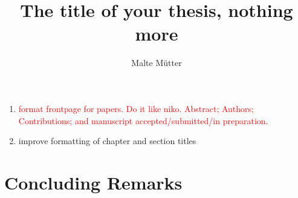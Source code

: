 \documentclass{thesis}
\title{The title of your thesis, nothing more}
\author{Malte Mütter}
\date{} %
\begin{document}
\frontmatter

\begin{summaryspacing}
  \tableofcontents*
\end{summaryspacing}

\pagebreak
\begin{enumerate}
  \item \textcolor{red}{format frontpage for papers. Do it like niko. Abstract; Authors; Contributions; and manuscript accepted/submitted/in preparation.}
  \item improve formatting of chapter and section titles
\end{enumerate}


\mainmatter
{}


%
%
\chapter{Concluding Remarks}
\end{document}
